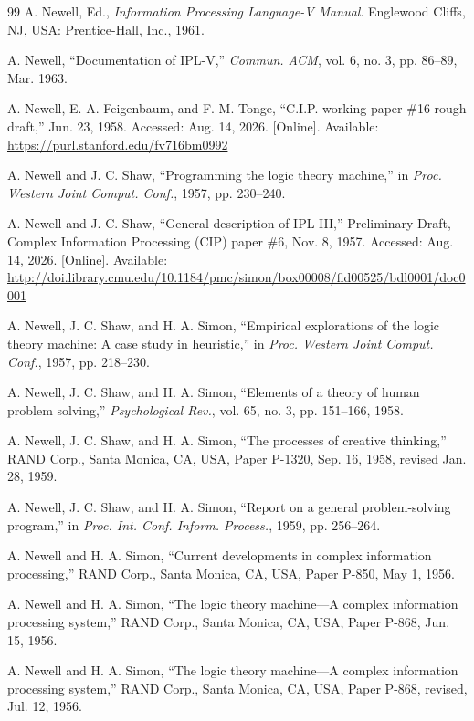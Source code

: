 \documentclass[journal]{IEEEtran}
\begin{document}
\begin{thebibliography}{99}
 A. Newell, Ed., \textit{Information
  Processing Language-V Manual}. Englewood Cliffs, NJ, USA:
  Prentice-Hall, Inc., 1961.

 A. Newell, ``Documentation of IPL-V,''
  \textit{Commun. ACM}, vol. 6, no. 3, pp. 86--89, Mar. 1963.

 A. Newell, E. A. Feigenbaum, and F. M. Tonge,
  ``C.I.P. working paper \#16 rough draft,'' Jun. 23, 1958.
  Accessed: Aug. 14, 2026.  [Online].
  Available: \url{https://purl.stanford.edu/fv716bm0992}

 A. Newell and J. C. Shaw, ``Programming the
  logic theory machine,'' in \textit{Proc. Western Joint
  Comput. Conf.}, 1957, pp. 230--240.

 A. Newell and J. C. Shaw,
  ``General description of IPL-III,''
  Preliminary Draft, Complex Information Processing (CIP) paper \#6,
  Nov. 8, 1957.
  Accessed: Aug. 14, 2026.  [Online].
  Available: \url{http://doi.library.cmu.edu/10.1184/pmc/simon/box00008/fld00525/bdl0001/doc0001}

 A. Newell, J. C. Shaw, and H. A. Simon, ``Empirical
  explorations of the logic theory machine: A case study in
  heuristic,'' in \textit{Proc. Western Joint Comput. Conf.}, 1957,
  pp. 218--230.

 A. Newell, J. C. Shaw, and H. A. Simon,
  ``Elements of a theory of human problem solving,''
  \textit{Psychological Rev.}, vol. 65, no. 3, pp. 151--166, 1958.

 A. Newell, J. C. Shaw, and H. A. Simon,
  ``The processes of creative thinking,''
  RAND Corp., Santa Monica, CA, USA, Paper P-1320,
  Sep. 16, 1958, revised Jan. 28, 1959.

 A. Newell, J. C. Shaw, and H. A. Simon,
  ``Report on a general problem-solving program,'' in
  \textit{Proc. Int. Conf. Inform. Process.}, 1959, pp. 256--264.

 A. Newell and H. A. Simon,
  ``Current developments in complex information processing,''
  RAND Corp., Santa Monica, CA, USA, Paper P-850, May 1, 1956.

 A. Newell and H. A. Simon,
  ``The logic theory machine---A complex information processing system,''
  RAND Corp., Santa Monica, CA, USA, Paper P-868, Jun. 15, 1956.

 A. Newell and H. A. Simon,
  ``The logic theory machine---A complex information processing system,''
  RAND Corp., Santa Monica, CA, USA, Paper P-868, revised, Jul. 12, 1956.


\end{thebibliography}
\end{document}
